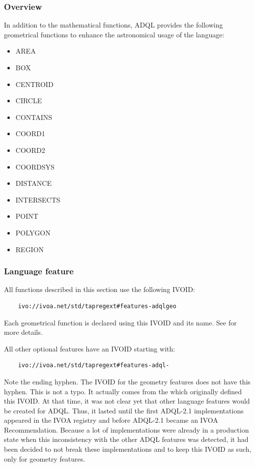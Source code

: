 \documentclass[11pt,a4paper]{ivoa}
\begin{document}
\subsubsection{Overview}
\label{sec:functions.geom.overview}

In addition to the mathematical functions, ADQL provides the following geometrical
functions to enhance the astronomical usage of the language:

\begin{itemize}
    \item AREA
    \item BOX
    \item CENTROID
    \item CIRCLE
    \item CONTAINS
    \item COORD1
    \item COORD2
    \item COORDSYS
    \item DISTANCE
    \item INTERSECTS
    \item POINT
    \item POLYGON
    \item REGION
\end{itemize}

\subsubsection{Language feature}
\label{sec:functions.geom.feature}

All functions described in this section use the following IVOID:

\begin{verbatim}
    ivo://ivoa.net/std/tapregext#features-adqlgeo
\end{verbatim}
    
Each geometrical function is declared using this IVOID and its name.
See  for more details.

All other optional features have an IVOID starting with:

\begin{verbatim}
    ivo://ivoa.net/std/tapregext#features-adql-
\end{verbatim}

Note the ending hyphen. The IVOID for the geometry features does not have this
hyphen. This is not a typo. It actually comes from the \TAPRegSpec{} which
originally defined this IVOID. At that time, it was not clear yet that other
language features would be created for ADQL. Thus, it lasted until the first
ADQL-2.1 implementations appeared in the IVOA registry and before ADQL-2.1
became an IVOA Recommendation. Because a lot of implementations were already in
a production state when this inconsistency with the other ADQL features was
detected, it had been decided to not break these implementations and to keep
this IVOID as such, only for geometry features.
\end{document}
